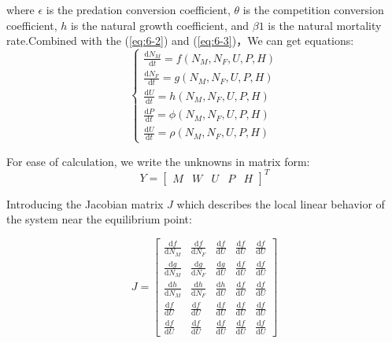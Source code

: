 \documentclass[12pt]{article}  %
\begin{document}
where $\epsilon$ is the predation conversion coefficient, $\theta$ is the competition conversion coefficient, $h$ is the natural growth coefficient, and $\beta1$ is the natural mortality rate.Combined with the (\ref{eq:6-2}) and (\ref{eq:6-3})，We can get equations:
\begin{equation}\label{eq:6-4}
\begin{cases}
	\frac{\mathrm{d}N_{M}}{\mathrm{d}t}=f(N_{M},N_{F},U,P,H)\\
	\frac{\mathrm{d}N_{F}}{\mathrm{d}t}=g(N_{M},N_{F},U,P,H)\\
	\frac{\mathrm{d}U}{\mathrm{d}t}=h(N_{M},N_{F},U,P,H) \\
	\frac{\mathrm{d}P}{\mathrm{d}t}=\phi(N_{M},N_{F},U,P,H) \\
	\frac{\mathrm{d}U}{\mathrm{d}t}=\rho(N_{M},N_{F},U,P,H)
\end{cases}
\end{equation}

For ease of calculation, we write the unknowns in matrix form:
\begin{equation}\label{eq:6-5}
Y =
\begin{bmatrix}
	M&W&U&P&H
\end{bmatrix}^{T}
\end{equation}

Introducing the Jacobian matrix $J$ which describes the local linear behavior of the system near the equilibrium point:

\begin{equation}\label{eq:6-6}
J = 
\begin{bmatrix}
	\frac{\mathrm{d}f}{\mathrm{d}N_{M}} & \frac{\mathrm{d}f}{\mathrm{d}N_{F}} &\frac{\mathrm{d}f}{\mathrm{d}U} &\frac{\mathrm{d}f}{\mathrm{d}U} &\frac{\mathrm{d}f}{\mathrm{d}U}\\
	\frac{\mathrm{d}g}{\mathrm{d}N_{M}} & \frac{\mathrm{d}g}{\mathrm{d}N_{F}} & \frac{\mathrm{d}g}{\mathrm{d}U} &\frac{\mathrm{d}f}{\mathrm{d}U} &\frac{\mathrm{d}f}{\mathrm{d}U}\\
	\frac{\mathrm{d}h}{\mathrm{d}N_{M}} & \frac{\mathrm{d}h}{\mathrm{d}N_{F}} & \frac{\mathrm{d}h}{\mathrm{d}U} &\frac{\mathrm{d}f}{\mathrm{d}U} &\frac{\mathrm{d}f}{\mathrm{d}U} \\
	\frac{\mathrm{d}f}{\mathrm{d}U}&\frac{\mathrm{d}f}{\mathrm{d}U} &\frac{\mathrm{d}f}{\mathrm{d}U} &\frac{\mathrm{d}f}{\mathrm{d}U} &\frac{\mathrm{d}f}{\mathrm{d}U} \\
	\frac{\mathrm{d}f}{\mathrm{d}U} &\frac{\mathrm{d}f}{\mathrm{d}U} &\frac{\mathrm{d}f}{\mathrm{d}U} &\frac{\mathrm{d}f}{\mathrm{d}U} &\frac{\mathrm{d}f}{\mathrm{d}U}
\end{bmatrix}
\end{equation}
\end{document}
